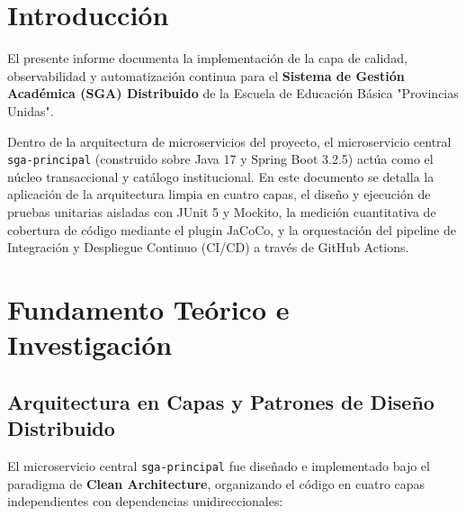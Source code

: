 \documentclass[11pt,a4paper]{article}
\begin{document}
\tableofcontents
\newpage

\section{Introducción}

El presente informe documenta la implementación de la capa de calidad, observabilidad y automatización continua para el \textbf{Sistema de Gestión Académica (SGA) Distribuido} de la Escuela de Educación Básica "Provincias Unidas". 

Dentro de la arquitectura de microservicios del proyecto, el microservicio central \texttt{sga-principal} (construido sobre Java 17 y Spring Boot 3.2.5) actúa como el núcleo transaccional y catálogo institucional. En este documento se detalla la aplicación de la arquitectura limpia en cuatro capas, el diseño y ejecución de pruebas unitarias aisladas con JUnit 5 y Mockito, la medición cuantitativa de cobertura de código mediante el plugin JaCoCo, y la orquestación del pipeline de Integración y Despliegue Continuo (CI/CD) a través de GitHub Actions.

\section{Fundamento Teórico e Investigación}

\subsection{Arquitectura en Capas y Patrones de Diseño Distribuido}

El microservicio central \texttt{sga-principal} fue diseñado e implementado bajo el paradigma de \textbf{Clean Architecture}, organizando el código en cuatro capas independientes con dependencias unidireccionales:
\end{document}
